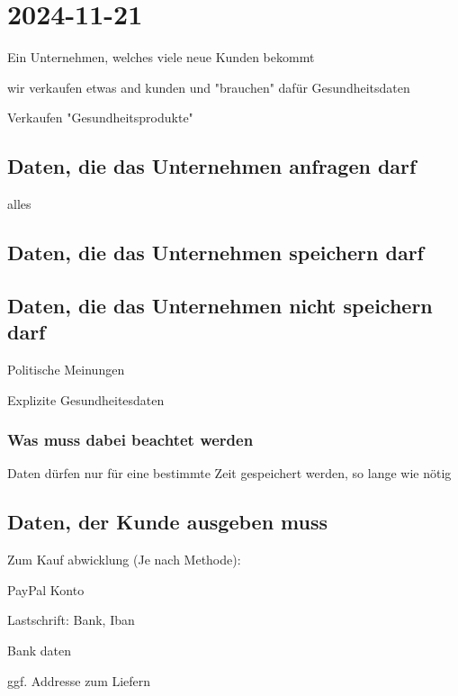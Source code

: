 \section{2024-11-21}

Ein Unternehmen, welches viele neue Kunden bekommt

wir verkaufen etwas and kunden und "brauchen" dafür  Gesundheitsdaten

Verkaufen "Gesundheitsprodukte"

\subsection{Daten, die das Unternehmen anfragen darf}

\startitemize[packed]
\item alles
\stopitemize

\subsection{Daten, die das Unternehmen speichern darf}

\subsection{Daten, die das Unternehmen nicht speichern darf}

\startitemize[packed]
\item Politische Meinungen
\item Explizite Gesundheitesdaten
\stopitemize

\subsubsection{Was muss dabei beachtet werden}

\startitemize[packed]
\item Daten dürfen nur für eine bestimmte Zeit gespeichert werden, so lange wie nötig
\stopitemize

\subsection{Daten, der Kunde ausgeben muss}

\startitemize[packed]
\item Zum Kauf abwicklung (Je nach Methode):
\startitemize[packed]
\item PayPal Konto
\item Lastschrift: Bank, Iban
\item Bank daten
\stopitemize
\item ggf. Addresse zum Liefern
\item 
\stopitemize
